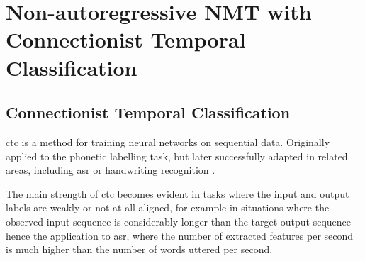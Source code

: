 \chapter{Non-autoregressive NMT with Connectionist Temporal Classification}
\label{chap:nar-nmt-ctc}



\section{Connectionist Temporal Classification}
\label{sec:ctc}

\Gls{ctc} \citep{graves2006connectionist} is a method for training neural
networks on sequential data. Originally applied to the phonetic labelling task,
but later successfully adapted in related areas, including \gls{asr} or
handwriting recognition \citep{liwicki2007novel, eyben2009speech,
  graves2014towards}.

The main strength of \gls{ctc} becomes evident in tasks where the input and
output labels are weakly or not at all aligned, for example in situations where
the observed input sequence is considerably longer than the target output
sequence -- hence the application to \gls{asr}, where the number of extracted
features per second is much higher than the number of words uttered per second.



